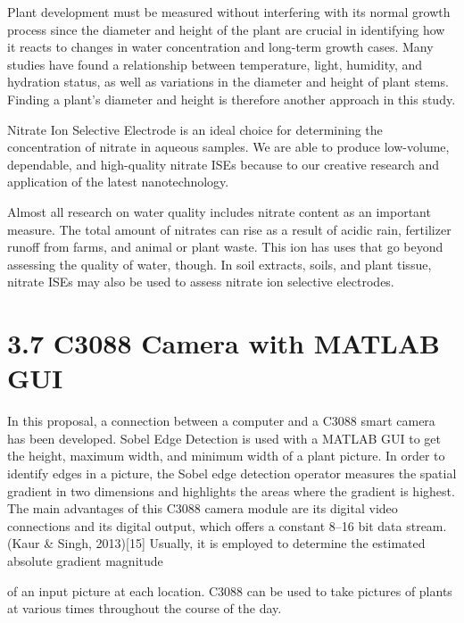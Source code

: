 \documentclass{book} %
\begin{document}
\noindent Plant development must be measured without interfering with its normal growth process since the diameter and height of the plant are crucial in identifying how it reacts to changes in water concentration and long-term growth cases. Many studies have found a relationship between temperature, light, humidity, and hydration status, as well as variations in the diameter and height of plant stems. Finding a plant's diameter and height is therefore another approach in this study.

\noindent Nitrate Ion Selective Electrode is an ideal choice for determining the concentration of nitrate in aqueous samples. We are able to produce low-volume, dependable, and high-quality nitrate ISEs because to our creative research and application of the latest nanotechnology.

\noindent 

\noindent Almost all research on water quality includes nitrate content as an important measure. The total amount of nitrates can rise as a result of acidic rain, fertilizer runoff from farms, and animal or plant waste. This ion has uses that go beyond assessing the quality of water, though. In soil extracts, soils, and plant tissue, nitrate ISEs may also be used to assess nitrate ion selective electrodes.

\noindent 
\section{3.7 C3088 Camera with MATLAB GUI}

\noindent In this proposal, a connection between a computer and a C3088 smart camera has been developed. Sobel Edge Detection is used with a MATLAB GUI to get the height, maximum width, and minimum width of a plant picture. In order to identify edges in a picture, the Sobel edge detection operator measures the spatial gradient in two dimensions and highlights the areas where the gradient is highest.  The main advantages of this C3088 camera module are its digital video connections and its digital output, which offers a constant 8--16 bit data stream. (Kaur \& Singh, 2013)[15] Usually, it is employed to determine the estimated absolute gradient magnitude 

\noindent of an input picture at each location. C3088 can be used to take pictures of plants at various times throughout the course of the day.                  

\noindent 

\noindent 
\end{document}

